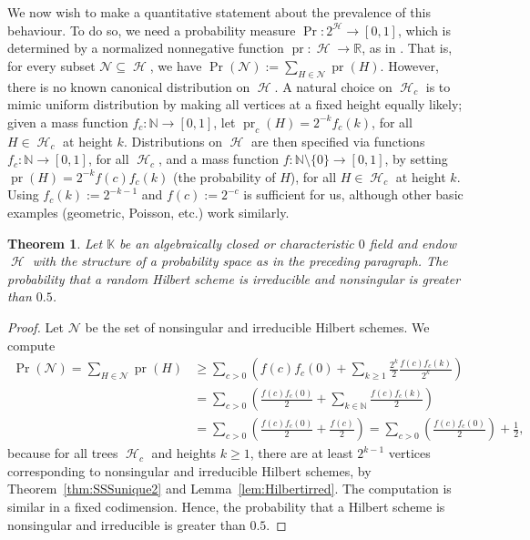 \documentclass[12pt]{amsart}%
\newtheorem{theorem}{Theorem}[section]
\theoremstyle{definition}%
\DeclareMathOperator{\hilbtree}{\mathscr{H}}%
\newcommand{\kk}{\mathbb{K}}%
\newcommand{\NN}{\mathbb{N}}%
\newcommand{\RR}{\mathbb{R}}%
\DeclareMathOperator{\prob}{Pr}%
\DeclareMathOperator{\pr}{pr}%
\begin{document}
We now wish to make a quantitative statement about the prevalence of
this behaviour.  To do so, we need a probability measure $\prob \colon
2^{\hilbtree} \to [0,1]$, which is determined by a normalized
nonnegative function $\pr \colon \hilbtree \to \RR$, as in
\cite[Examples~2.8--2.9]{Billingsley--1995}.  That is, for every
subset $\mathscr{N} \subseteq \hilbtree$, we have $\prob(\mathscr{N})
:= \sum_{H \in \mathscr{N}} \pr(H)$.  However, there is no known
canonical distribution on $\hilbtree$.  A natural choice on
$\hilbtree_c$ is to mimic uniform distribution by making all vertices
at a fixed height equally likely; given a mass function $f_c \colon
\NN \to [0,1]$, let $\pr_c (H) = 2^{-k} f_c( k )$, for all $H \in
\hilbtree_c$ at height $k$.  Distributions on $\hilbtree$ are then
specified via functions $f_c \colon \NN \to [0,1]$, for all
$\hilbtree_c$, and a mass function $f \colon \NN \setminus \{ 0 \} \to
[0,1]$, by setting $\pr (H) = 2^{-k} f(c) f_c(k)$ (the probability of
$H$), for all $H \in \hilbtree_c$ at height $k$.  Using $f_c(k) :=
2^{-k-1}$ and $f(c) := 2^{-c}$ is sufficient for us, although other
basic examples (geometric, Poisson, etc.) work similarly.

\begin{theorem}
  \label{thm:Hilbertprob}
  Let $\kk$ be an algebraically closed or characteristic $0$ field and
  endow $\hilbtree$ with the structure of a probability space as in
  the preceding paragraph.  The probability that a random Hilbert
  scheme is irreducible and nonsingular is greater than $0.5$.
\end{theorem}

\begin{proof}
  Let $\mathscr{N}$ be the set of nonsingular and irreducible Hilbert
  schemes.  We compute
  \begin{align*}
    \prob(\mathcal{N}) = \sum_{H \in \mathscr{N}} \pr \left( H \right)
    &\ge \sum_{c > 0} \left( f(c) f_c(0) + \sum_{k \ge 1}
    \frac{2^k}{2} \frac{f(c) f_c(k)}{2^k} \right) \\
    &= \sum_{c > 0} \left( \frac{f(c) f_c(0)}{2} + \sum_{k \in \NN}
    \frac{f(c) f_c(k)}{2} \right) \\
    &= \sum_{c > 0} \left( \frac{f(c) f_c(0)}{2} + \frac{f(c)}{2}
    \right) = \sum_{c > 0} \left( \frac{f(c) f_c(0)}{2} \right) +
    \frac{1}{2},
  \end{align*}
  because for all trees $\hilbtree_c$ and heights $k \ge 1$, there are
  at least $2^{k-1}$ vertices corresponding to nonsingular and
  irreducible Hilbert schemes, by Theorem~\ref{thm:SSSunique2} and
  Lemma~\ref{lem:Hilbertirred}.  The computation is similar in a fixed
  codimension.  Hence, the probability that a Hilbert scheme is
  nonsingular and irreducible is greater than $0.5$.
\end{proof}
\end{document}
